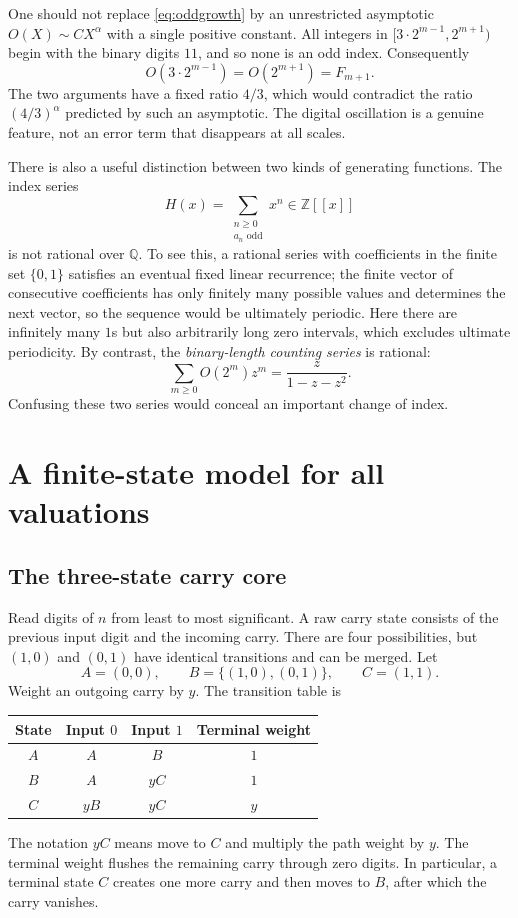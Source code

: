 \documentclass[11pt]{article}
\theoremstyle{definition}\newtheorem{definition}[theorem]{Definition}
\theoremstyle{remark}\newtheorem{remark}[theorem]{Remark}
\newcommand{\Z}{\mathbb Z}
\newcommand{\Q}{\mathbb Q}
\begin{document}
One should not replace \eqref{eq:oddgrowth} by an unrestricted asymptotic
$O(X)\sim C X^\alpha$ with a single positive constant. All integers in
$[3\cdot2^{m-1},2^{m+1})$ begin with the binary digits $11$, and so none
is an odd index. Consequently
\[
 O(3\cdot2^{m-1})=O(2^{m+1})=F_{m+1}.
\]
The two arguments have a fixed ratio $4/3$, which would contradict the
ratio $(4/3)^\alpha$ predicted by such an asymptotic. The digital
oscillation is a genuine feature, not an error term that disappears at
all scales.

There is also a useful distinction between two kinds of generating
functions. The index series
\[
 H(x)=\sum_{\substack{n\geq0\\a_n\text{ odd}}}x^n\in\Z[[x]]
\]
is not rational over $\Q$. To see this, a rational series with coefficients
in the finite set $\{0,1\}$ satisfies an eventual fixed linear recurrence;
the finite vector of consecutive coefficients has only finitely many
possible values and determines the next vector, so the sequence would
be ultimately periodic. Here there are infinitely many $1$s but also
arbitrarily long zero intervals, which excludes ultimate periodicity.
By contrast, the \emph{binary-length counting series} is rational:
\[
 \sum_{m\geq0}O(2^m)z^m=\frac{z}{1-z-z^2}.
\]
Confusing these two series would conceal an important change of index.

\section{A finite-state model for all valuations}\label{sec:automaton}

\subsection{The three-state carry core}
Read digits of $n$ from least to most significant. A raw carry state
consists of the previous input digit and the incoming carry. There are
four possibilities, but $(1,0)$ and $(0,1)$ have identical transitions
and can be merged. Let
\[
 A=(0,0),\qquad B=\{(1,0),(0,1)\},\qquad C=(1,1).
\]
Weight an outgoing carry by $y$. The transition table is
\begin{center}
\begin{tabular}{c cc c}
\toprule
State & Input $0$ & Input $1$ & Terminal weight\\
\midrule
$A$ & $A$ & $B$ & $1$\\
$B$ & $A$ & $yC$ & $1$\\
$C$ & $yB$ & $yC$ & $y$\\
\bottomrule
\end{tabular}
\end{center}
The notation $yC$ means move to $C$ and multiply the path weight by $y$.
The terminal weight flushes the remaining carry through zero digits.
In particular, a terminal state $C$ creates one more carry and then
moves to $B$, after which the carry vanishes.
\end{document}
